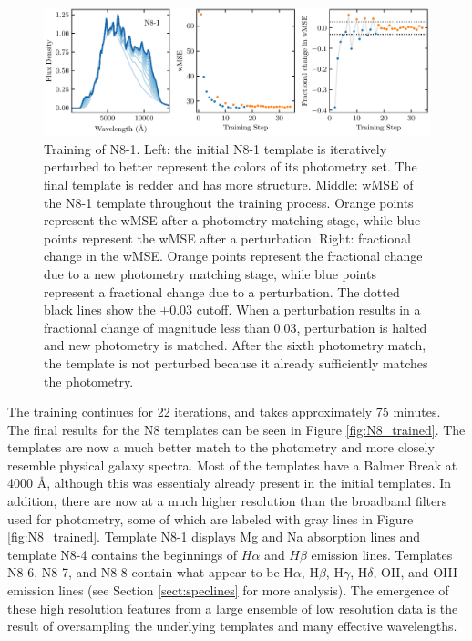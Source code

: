 \begin{figure}
    \centering
    \includegraphics{figures/N8_1_training_history.pdf}
    \caption{Training of N8-1. Left: the initial N8-1 template is iteratively perturbed to better represent the colors of its photometry set. The final template is redder and has more structure. Middle: wMSE of the N8-1 template throughout the training process. Orange points represent the wMSE after a photometry matching stage, while blue points represent the wMSE after a perturbation. Right: fractional change in the wMSE. Orange points represent the fractional change due to a new photometry matching stage, while blue points represent a fractional change due to a perturbation. The dotted black lines show the $\pm 0.03$ cutoff. When a perturbation results in a fractional change of magnitude less than 0.03, perturbation is halted and new photometry is matched. After the sixth photometry match, the template is not perturbed because it already sufficiently matches the photometry.}
    \label{fig:training}
\end{figure}

The training continues for 22 iterations, and takes approximately 75 minutes.
The final results for the N8 templates can be seen in Figure \ref{fig:N8_trained}.
The templates are now a much better match to the photometry and more closely resemble physical galaxy spectra.
Most of the templates have a Balmer Break at 4000 \AA, although this was essentialy already present in the initial templates.
In addition, there are now at a much higher resolution than the broadband filters used for photometry, some of which are labeled with gray lines in Figure \ref{fig:N8_trained}.
Template N8-1 displays Mg and Na absorption lines and template N8-4 contains the beginnings of $H\alpha$ and $H\beta$ emission lines.
Templates N8-6, N8-7, and N8-8 contain what appear to be H$\alpha$, H$\beta$, H$\gamma$, H$\delta$, OII, and OIII emission lines (see Section \ref{sect:speclines} for more analysis).
The emergence of these high resolution features from a large ensemble of low resolution data is the result of oversampling the underlying templates and many effective wavelengths. 

